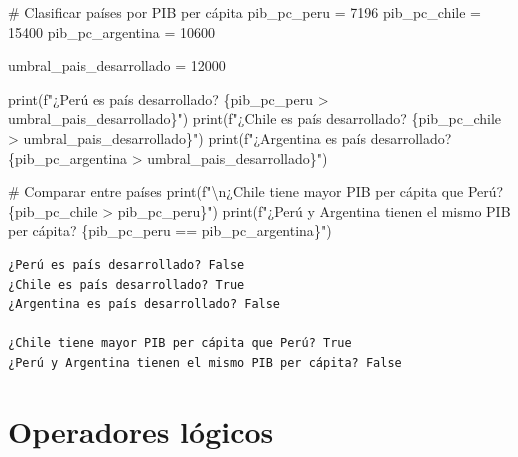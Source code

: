 \documentclass[
  doc,
  floatsintext,
  longtable,
  a4paper,
  nolmodern,
  notxfonts,
  notimes,
  12pt,
  colorlinks=true,linkcolor=blue,citecolor=blue,urlcolor=blue]{apa7}
\newenvironment{Shaded}{\begin{snugshade}}{\end{snugshade}}
\newcommand{\BuiltInTok}[1]{\textcolor[rgb]{0.00,0.23,0.31}{#1}}
\newcommand{\CharTok}[1]{\textcolor[rgb]{0.13,0.47,0.30}{#1}}
\newcommand{\CommentTok}[1]{\textcolor[rgb]{0.37,0.37,0.37}{#1}}
\newcommand{\DecValTok}[1]{\textcolor[rgb]{0.68,0.00,0.00}{#1}}
\newcommand{\NormalTok}[1]{\textcolor[rgb]{0.00,0.23,0.31}{#1}}
\newcommand{\OperatorTok}[1]{\textcolor[rgb]{0.37,0.37,0.37}{#1}}
\newcommand{\SpecialCharTok}[1]{\textcolor[rgb]{0.37,0.37,0.37}{#1}}
\newcommand{\SpecialStringTok}[1]{\textcolor[rgb]{0.13,0.47,0.30}{#1}}
\begin{document}
\begin{Shaded}
\begin{Highlighting}[]
\CommentTok{\# Clasificar países por PIB per cápita}
\NormalTok{pib\_pc\_peru }\OperatorTok{=} \DecValTok{7196}
\NormalTok{pib\_pc\_chile }\OperatorTok{=} \DecValTok{15400}
\NormalTok{pib\_pc\_argentina }\OperatorTok{=} \DecValTok{10600}

\NormalTok{umbral\_pais\_desarrollado }\OperatorTok{=} \DecValTok{12000}

\BuiltInTok{print}\NormalTok{(}\SpecialStringTok{f"¿Perú es país desarrollado? }\SpecialCharTok{\{}\NormalTok{pib\_pc\_peru }\OperatorTok{\textgreater{}}\NormalTok{ umbral\_pais\_desarrollado}\SpecialCharTok{\}}\SpecialStringTok{"}\NormalTok{)}
\BuiltInTok{print}\NormalTok{(}\SpecialStringTok{f"¿Chile es país desarrollado? }\SpecialCharTok{\{}\NormalTok{pib\_pc\_chile }\OperatorTok{\textgreater{}}\NormalTok{ umbral\_pais\_desarrollado}\SpecialCharTok{\}}\SpecialStringTok{"}\NormalTok{)}
\BuiltInTok{print}\NormalTok{(}\SpecialStringTok{f"¿Argentina es país desarrollado? }\SpecialCharTok{\{}\NormalTok{pib\_pc\_argentina }\OperatorTok{\textgreater{}}\NormalTok{ umbral\_pais\_desarrollado}\SpecialCharTok{\}}\SpecialStringTok{"}\NormalTok{)}

\CommentTok{\# Comparar entre países}
\BuiltInTok{print}\NormalTok{(}\SpecialStringTok{f"}\CharTok{\textbackslash{}n}\SpecialStringTok{¿Chile tiene mayor PIB per cápita que Perú? }\SpecialCharTok{\{}\NormalTok{pib\_pc\_chile }\OperatorTok{\textgreater{}}\NormalTok{ pib\_pc\_peru}\SpecialCharTok{\}}\SpecialStringTok{"}\NormalTok{)}
\BuiltInTok{print}\NormalTok{(}\SpecialStringTok{f"¿Perú y Argentina tienen el mismo PIB per cápita? }\SpecialCharTok{\{}\NormalTok{pib\_pc\_peru }\OperatorTok{==}\NormalTok{ pib\_pc\_argentina}\SpecialCharTok{\}}\SpecialStringTok{"}\NormalTok{)}
\end{Highlighting}
\end{Shaded}

\begin{verbatim}
¿Perú es país desarrollado? False
¿Chile es país desarrollado? True
¿Argentina es país desarrollado? False

¿Chile tiene mayor PIB per cápita que Perú? True
¿Perú y Argentina tienen el mismo PIB per cápita? False
\end{verbatim}

\section{Operadores lógicos}\label{operadores-luxf3gicos}
\end{document}
